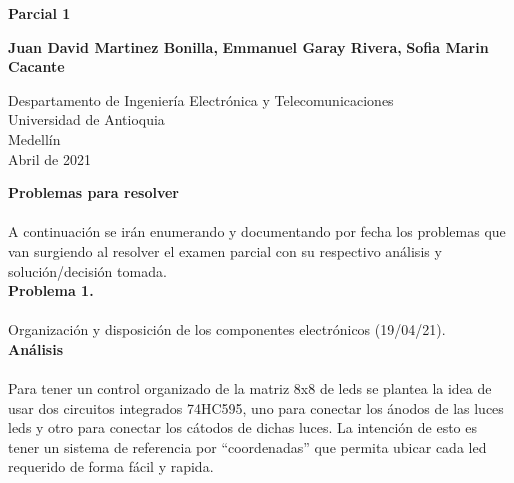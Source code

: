 \documentclass{article}
\begin{document}
\begin{titlepage}
    \begin{center}
        \vspace*{1cm}
            
        \Huge
        \textbf{Parcial 1}
            
        \vspace{0.5cm}
        \LARGE
            
        \vspace{5cm}
            
        \textbf{Juan David Martinez Bonilla,}
        \textbf{Emmanuel Garay Rivera,}
        \textbf{Sofia Marin Cacante}
            
        \vfill
            
        \vspace{0.8cm}
            
        \Large
        Despartamento de Ingeniería Electrónica y Telecomunicaciones\\
        Universidad de Antioquia\\
        Medellín\\
        Abril de 2021
            
    \end{center}
\end{titlepage}


\newpage
\textbf{\large Problemas para resolver }\\\\
A continuación se irán enumerando y documentando por fecha los problemas que van surgiendo al resolver el examen parcial con su respectivo análisis y solución/decisión tomada.\\

\textbf{\large Problema 1.}\\\\	Organización y disposición de los componentes electrónicos (19/04/21).\\

\textbf{\large Análisis}\\\\
Para tener un control organizado de la matriz 8x8 de leds se plantea la idea de usar dos circuitos integrados 74HC595, uno para conectar los ánodos de las luces leds y otro para conectar los cátodos de dichas luces.
La intención de esto es tener un sistema de referencia por “coordenadas” que permita ubicar cada led requerido de forma fácil y rapida.\\
\end{document}
